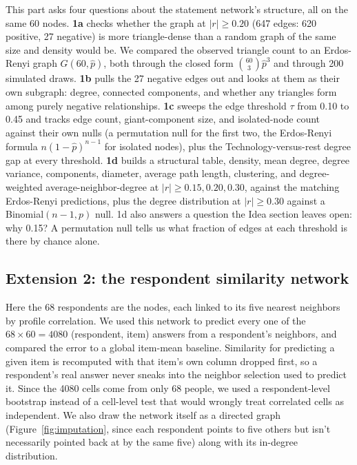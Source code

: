\documentclass[11pt]{article}
\begin{document}
This part asks four questions about the statement network's structure, all on the same 60 nodes.
\textbf{1a} checks whether the graph at $|r| \geq 0.20$ (647 edges: 620 positive, 27 negative) is more
triangle-dense than a random graph of the same size and density would be. We compared the observed
triangle count to an Erdos-Renyi graph $G(60, \hat p)$, both through the closed form
$\binom{60}{3}\hat p^3$ and through 200 simulated draws. \textbf{1b} pulls the 27 negative edges out
and looks at them as their own subgraph: degree, connected components, and whether any triangles form
among purely negative relationships. \textbf{1c} sweeps the edge threshold $\tau$ from 0.10 to 0.45
and tracks edge count, giant-component size, and isolated-node count against their own nulls (a
permutation null for the first two, the Erdos-Renyi formula $n(1-\hat p)^{n-1}$ for isolated nodes),
plus the Technology-versus-rest degree gap at every threshold. \textbf{1d} builds a structural table,
density, mean degree, degree variance, components, diameter, average path length, clustering, and
degree-weighted average-neighbor-degree at $|r| \geq 0.15, 0.20, 0.30$, against the matching
Erdos-Renyi predictions, plus the degree distribution at $|r| \geq 0.30$ against a
Binomial$(n{-}1, p)$ null. 1d also answers a question the Idea section leaves open: why 0.15? A
permutation null tells us what fraction of edges at each threshold is there by chance alone.

\subsection{Extension 2: the respondent similarity network}

Here the 68 respondents are the nodes, each linked to its five nearest neighbors by profile
correlation. We used this network to predict every one of the $68 \times 60 = 4080$ (respondent, item)
answers from a respondent's neighbors, and compared the error to a global item-mean baseline.
Similarity for predicting a given item is recomputed with that item's own column dropped first, so a
respondent's real answer never sneaks into the neighbor selection used to predict it. Since the 4080
cells come from only 68 people, we used a respondent-level bootstrap instead of a cell-level test that
would wrongly treat correlated cells as independent. We also draw the network itself as a directed
graph (Figure~\ref{fig:imputation}, since each respondent points to five others but isn't necessarily
pointed back at by the same five) along with its in-degree distribution.
\end{document}
